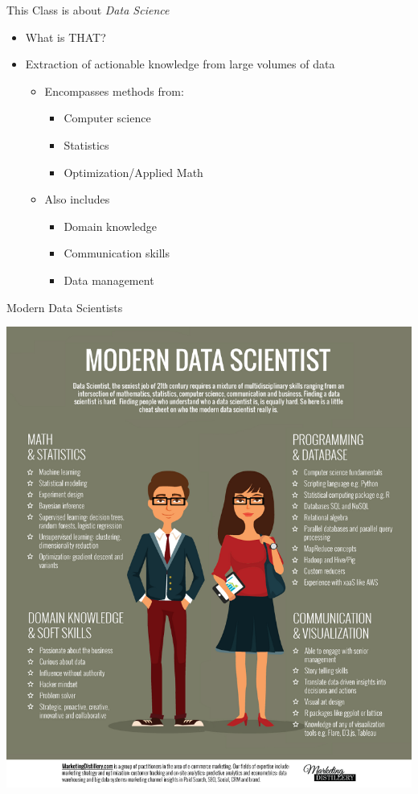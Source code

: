 \documentclass[aspectratio=169]{beamer}
\begin{document}
\begin{frame}{This Class is about \emph{Data Science}}

\begin{itemize}
\item What is THAT? 
\item Extraction of actionable knowledge from large volumes of data
	\begin{itemize}
	\item Encompasses methods from: 
		\begin{itemize}
		\item Computer science
		\item Statistics
		\item Optimization/Applied Math
		\end{itemize}
	\item Also includes
		\begin{itemize}
		\item Domain knowledge
		\item Communication skills
		\item Data management
		\end{itemize}

	\end{itemize}
    \end{itemize}
\end{frame}

\begin{frame}{Modern Data Scientists}

\includegraphics[width=.45\textwidth]{lectOverview/lookLike.png}

\end{frame}

\end{document}
